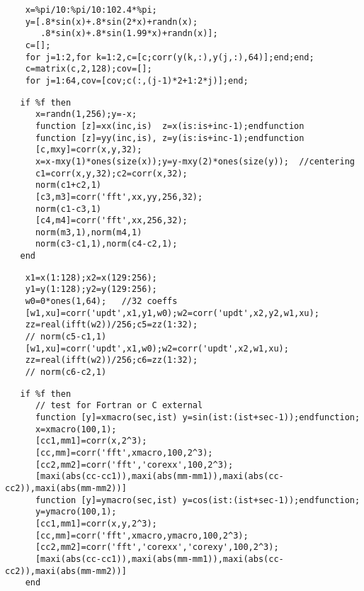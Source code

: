 \begin{examples}
  \begin{Verbatim}
    x=%pi/10:%pi/10:102.4*%pi;
    y=[.8*sin(x)+.8*sin(2*x)+randn(x);
       .8*sin(x)+.8*sin(1.99*x)+randn(x)];
    c=[];
    for j=1:2,for k=1:2,c=[c;corr(y(k,:),y(j,:),64)];end;end;
    c=matrix(c,2,128);cov=[];
    for j=1:64,cov=[cov;c(:,(j-1)*2+1:2*j)];end;
  \end{Verbatim}

  \begin{Verbatim}
   if %f then
      x=randn(1,256);y=-x;
      function [z]=xx(inc,is)  z=x(is:is+inc-1);endfunction
      function [z]=yy(inc,is), z=y(is:is+inc-1);endfunction
      [c,mxy]=corr(x,y,32);
      x=x-mxy(1)*ones(size(x));y=y-mxy(2)*ones(size(y));  //centering
      c1=corr(x,y,32);c2=corr(x,32);
      norm(c1+c2,1)
      [c3,m3]=corr('fft',xx,yy,256,32);
      norm(c1-c3,1)
      [c4,m4]=corr('fft',xx,256,32);
      norm(m3,1),norm(m4,1)
      norm(c3-c1,1),norm(c4-c2,1);
   end
  \end{Verbatim}

  \begin{Verbatim}
    x1=x(1:128);x2=x(129:256);
    y1=y(1:128);y2=y(129:256);
    w0=0*ones(1,64);   //32 coeffs
    [w1,xu]=corr('updt',x1,y1,w0);w2=corr('updt',x2,y2,w1,xu);
    zz=real(ifft(w2))/256;c5=zz(1:32);
    // norm(c5-c1,1)
    [w1,xu]=corr('updt',x1,w0);w2=corr('updt',x2,w1,xu);
    zz=real(ifft(w2))/256;c6=zz(1:32);
    // norm(c6-c2,1)
  \end{Verbatim}

  \begin{Verbatim}
   if %f then
      // test for Fortran or C external 
      function [y]=xmacro(sec,ist) y=sin(ist:(ist+sec-1));endfunction;
      x=xmacro(100,1);
      [cc1,mm1]=corr(x,2^3);
      [cc,mm]=corr('fft',xmacro,100,2^3);
      [cc2,mm2]=corr('fft','corexx',100,2^3);
      [maxi(abs(cc-cc1)),maxi(abs(mm-mm1)),maxi(abs(cc-cc2)),maxi(abs(mm-mm2))]
      function [y]=ymacro(sec,ist) y=cos(ist:(ist+sec-1));endfunction;
      y=ymacro(100,1);
      [cc1,mm1]=corr(x,y,2^3);
      [cc,mm]=corr('fft',xmacro,ymacro,100,2^3);
      [cc2,mm2]=corr('fft','corexx','corexy',100,2^3);
      [maxi(abs(cc-cc1)),maxi(abs(mm-mm1)),maxi(abs(cc-cc2)),maxi(abs(mm-mm2))]
    end
  \end{Verbatim}
\end{examples}
\begin{manseealso}
\end{manseealso}
